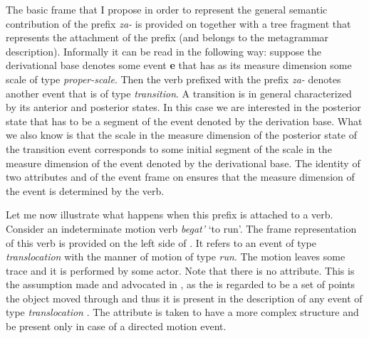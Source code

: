 The basic frame that I propose in order to represent the general semantic contribution of the prefix \textit{za-}   is provided on  together with a tree fragment that represents the attachment of the prefix (and belongs to the metagrammar description). Informally it can be read in the following way: suppose the derivational base denotes some event \textbf{e} that has as its measure dimension some scale of type \textit{proper-scale}. Then the verb prefixed with the prefix \textit{za-}   denotes another event that is of type \textit{transition}. A transition is in general characterized by its anterior and posterior states. In this case we are interested in the posterior state that has to be a segment of the event denoted by the derivation base. What we also know is that the scale in the measure dimension of the posterior state of the transition event corresponds to some initial segment of the scale in the measure dimension of the event denoted by the derivational base. The identity of two attributes {\scshape\VERBDIM} and {\scshape\MDIM} of the event frame on  ensures that the measure dimension of the event is determined by the verb.

Let me now illustrate what happens when this prefix is attached to a verb. Consider an indeterminate motion verb \textit{begat'} `to run'. The frame representation of this verb is provided on the left side of . It refers to an event of type \textit{translocation } with the manner of motion of type \textit{run}. The motion leaves some trace and it is performed by some actor. Note that there is no \PATH attribute. This is the assumption made and advocated in \citealt{ZinovaOsswald:paper}, as the \TRACE is regarded to be a set of points the object moved through and thus it is present in the description of any event of type \textit{translocation }. The \PATH attribute is taken to have a more complex structure and be present only in case of a directed motion event.

